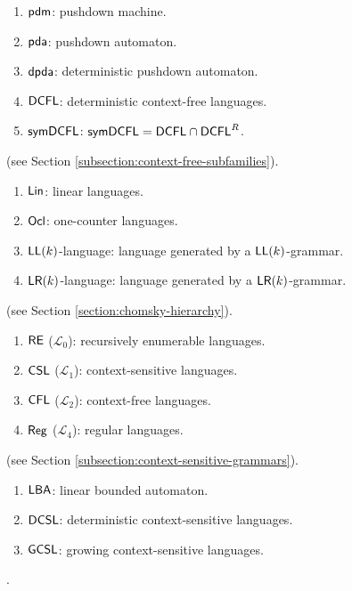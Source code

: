 \begin{enumerate}[]
\item $\textup{\sf pdm}$: pushdown machine.
\item $\textup{\sf pda}$: pushdown automaton.
\item $\textup{\sf dpda}$: deterministic pushdown automaton.
\item $\textup{\sf DCFL}$: deterministic context-free languages.
\item $\textup{\sf symDCFL}$: $\textup{\sf symDCFL} = \textup{\sf DCFL}\cap\textup{\sf DCFL}^R$.
\end{enumerate}


 (see Section \ref{subsection:context-free-subfamilies}).

\begin{enumerate}[]
\item $\textup{\sf Lin}$: linear languages.
\item $\textup{\sf Ocl}$: one-counter languages.
\item $\textup{\sf LL}(k)$-language: language generated by a $\textup{\sf LL}(k)$-grammar.
\item $\textup{\sf LR}(k)$-language: language generated by a $\textup{\sf LR}(k)$-grammar.
\end{enumerate}

 (see Section \ref{section:chomsky-hierarchy}).

\begin{enumerate}[]
\item $\textup{\sf RE}$ ($\mathcal{L}_0$): recursively enumerable languages.
\item $\textup{\sf CSL}$ ($\mathcal{L}_1$): context-sensitive languages.
\item $\textup{\sf CFL}$ ($\mathcal{L}_2$): context-free languages.
\item $\textup{\sf Reg}$ ($\mathcal{L}_4$): regular languages.
\end{enumerate}

 (see Section \ref{subsection:context-sensitive-grammars}).

\begin{enumerate}[]
\item $\textup{\sf LBA}$: linear bounded automaton.
\item $\textup{\sf DCSL}$: deterministic context-sensitive languages.
\item $\textup{\sf GCSL}$: growing context-sensitive languages.
\end{enumerate}

.

